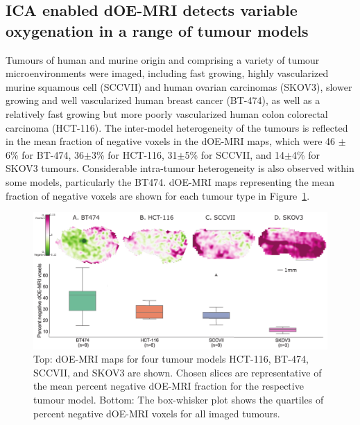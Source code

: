 \subsection{ICA enabled \ac{dOE-MRI} detects variable oxygenation in a range of tumour models}
\label{sec:rangeModels}
Tumours of human and murine origin and comprising a variety of tumour microenvironments were imaged, including fast growing, highly vascularized murine squamous cell (SCCVII) and human ovarian carcinomas (SKOV3), slower growing and well vascularized human breast cancer (BT-474), as well as a relatively fast growing but more poorly vascularized human colon colorectal carcinoma (HCT-116).
The inter-model heterogeneity of the tumours is reflected in the mean fraction of negative voxels in the \ac{dOE-MRI} maps, which were 46 $\pm$ 6\% for BT-474, 36$\pm$3\% for HCT-116, 31$\pm$5\% for SCCVII, and 14$\pm$4\% for SKOV3 tumours. 
Considerable intra-tumour heterogeneity is also observed within some models, particularly the BT474.
\ac{dOE-MRI} maps representing the mean fraction of negative voxels are shown for each tumour type in Figure~\ref{versatile}.
\begin{figure}[htbp]
   \centering
   \includegraphics[width=\textwidth]{oemri_thesis1/oemri_thesis1-images/fig2_versatile.pdf} %
   \caption{Top: \ac{dOE-MRI} maps for four tumour models HCT-116, BT-474, SCCVII, and SKOV3 are shown. Chosen slices are representative of the mean percent negative \ac{dOE-MRI} fraction for the respective tumour model.
Bottom: The box-whisker plot shows the quartiles of percent negative \ac{dOE-MRI} voxels for all imaged tumours.
\label{versatile}}
\end{figure}


